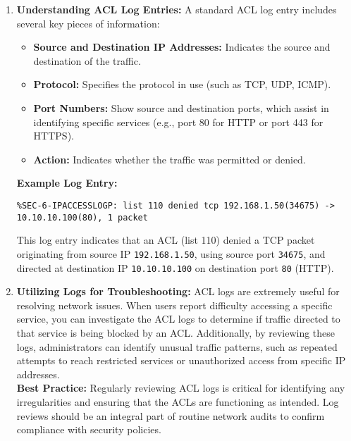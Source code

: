 \documentclass[11pt,a4paper]{article}
\begin{document}
        \begin{enumerate}
            \item \textbf{Understanding ACL Log Entries:} A standard ACL log entry includes several key pieces of information:
                \begin{itemize}
                    \item \textbf{Source and Destination IP Addresses:} Indicates the source and destination of the traffic.

                    \item \textbf{Protocol:} Specifies the protocol in use (such as TCP, UDP, ICMP).

                    \item \textbf{Port Numbers:} Show source and destination ports, which assist in identifying specific services (e.g., port 80 for HTTP or port 443 for HTTPS).

                    \item \textbf{Action:} Indicates whether the traffic was permitted or denied.

                \end{itemize}
                \textbf{Example Log Entry:}
\begin{lstlisting}
%SEC-6-IPACCESSLOGP: list 110 denied tcp 192.168.1.50(34675) -> 10.10.10.100(80), 1 packet                                                                        
\end{lstlisting}
                This log entry indicates that an ACL (list 110) denied a TCP packet originating from source IP \lstinline{192.168.1.50}, using source port \lstinline{34675}, and directed at destination IP \lstinline{10.10.10.100} on destination port \lstinline{80} (HTTP).

            \item \textbf{Utilizing Logs for Troubleshooting:} ACL logs are extremely useful for resolving network issues. When users report difficulty accessing a specific service, you can investigate the ACL logs to determine if traffic directed to that service is being blocked by an ACL. Additionally, by reviewing these logs, administrators can identify unusual traffic patterns, such as repeated attempts to reach restricted services or unauthorized access from specific IP addresses.
            \\[1em]
            \textbf{Best Practice:} Regularly reviewing ACL logs is critical for identifying any irregularities and ensuring that the ACLs are functioning as intended. Log reviews should be an integral part of routine network audits to confirm compliance with security policies.

        \end{enumerate}
\end{document}

